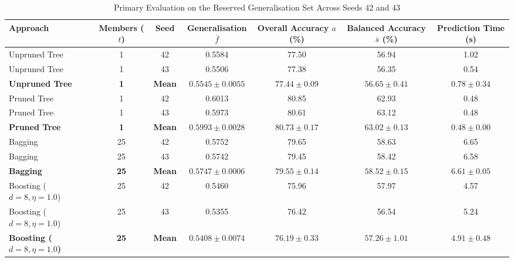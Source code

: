 \begin{table}[!t]
\centering
\caption{Primary Evaluation on the Reserved Generalisation Set Across Seeds 42 and 43}
\label{tab:generalization_summary}
\footnotesize
\setlength{\tabcolsep}{4.0pt}
\begin{tabular}{lcccccc}
\toprule
\textbf{Approach} & \textbf{Members ($t$)} & \textbf{Seed} & \textbf{Generalisation $\bar{f}$} & \textbf{Overall Accuracy $a$ (\%)} & \textbf{Balanced Accuracy $\bar{s}$ (\%)} & \textbf{Prediction Time (s)} \\
\midrule
Unpruned Tree   &  1 & 42   & 0.5584 & 77.50 & 56.94 & 1.02 \\
Unpruned Tree   &  1 & 43   & 0.5506 & 77.38 & 56.35 & 0.54 \\
\textbf{Unpruned Tree} & \textbf{1} & \textbf{Mean} & $\mathbf{0.5545 \pm 0.0055}$ & $\mathbf{77.44 \pm 0.09}$ & $\mathbf{56.65 \pm 0.41}$ & $\mathbf{0.78 \pm 0.34}$ \\
\midrule
Pruned Tree     &  1 & 42   & 0.6013 & 80.85 & 62.93 & 0.48 \\
Pruned Tree     &  1 & 43   & 0.5973 & 80.61 & 63.12 & 0.48 \\
\textbf{Pruned Tree}   & \textbf{1} & \textbf{Mean} & $\mathbf{0.5993 \pm 0.0028}$ & $\mathbf{80.73 \pm 0.17}$ & $\mathbf{63.02 \pm 0.13}$ & $\mathbf{0.48 \pm 0.00}$ \\
\midrule
Bagging         & 25 & 42   & 0.5752 & 79.65 & 58.63 & 6.65 \\
Bagging         & 25 & 43   & 0.5742 & 79.45 & 58.42 & 6.58 \\
\textbf{Bagging}       & \textbf{25} & \textbf{Mean} & $\mathbf{0.5747 \pm 0.0006}$ & $\mathbf{79.55 \pm 0.14}$ & $\mathbf{58.52 \pm 0.15}$ & $\mathbf{6.61 \pm 0.05}$ \\
\midrule
Boosting ($d=8, \eta=1.0$) & 25 & 42   & 0.5460 & 75.96 & 57.97 & 4.57 \\
Boosting ($d=8, \eta=1.0$) & 25 & 43   & 0.5355 & 76.42 & 56.54 & 5.24 \\
\textbf{Boosting ($d=8, \eta=1.0$)} & \textbf{25} & \textbf{Mean} & $\mathbf{0.5408 \pm 0.0074}$ & $\mathbf{76.19 \pm 0.33}$ & $\mathbf{57.26 \pm 1.01}$ & $\mathbf{4.91 \pm 0.48}$ \\
\bottomrule
\end{tabular}
\end{table}

